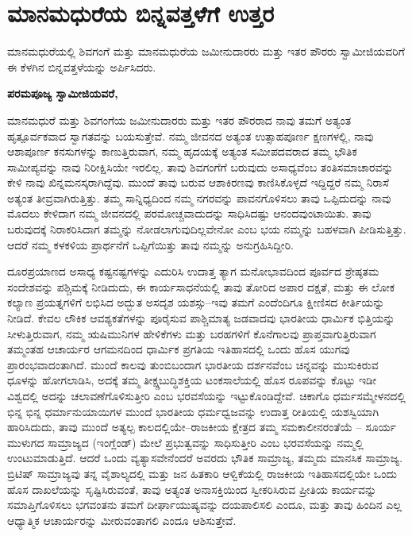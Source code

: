 
\chapter{ಮಾನಮಧುರೆಯ ಬಿನ್ನವತ್ತಳೆಗೆ ಉತ್ತರ}

ಮಾನಮಧುರೆಯಲ್ಲಿ ಶಿವಗಂಗೆ ಮತ್ತು ಮಾನಮಧುರೆಯ ಜಮೀನುದಾರರು ಮತ್ತು ಇತರ ಪೌರರು ಸ್ವಾಮೀಜಿಯವರಿಗೆ ಈ ಕೆಳಗಿನ ಬಿನ್ನವತ್ತಳೆಯನ್ನು ಅರ್ಪಿಸಿ\-ದರು.

\textbf{ಪರಮಪೂಜ್ಯ ಸ್ವಾಮೀಜಿಯವರೆ,}

ಮಾನಮಧುರೆ ಮತ್ತು ಶಿವಗಂಗೆಯ ಜಮೀನುದಾರರು ಮತ್ತು ಇತರ ಪೌರರಾದ ನಾವು ತಮಗೆ ಅತ್ಯಂತ ಹೃತ್ಪೂರ್ವಕವಾದ ಸ್ವಾಗತವನ್ನು ಬಯಸುತ್ತೇವೆ. ನಮ್ಮ ಜೀವನದ ಅತ್ಯಂತ ಉತ್ಸಾಹಪೂರ್ಣ ಕ್ಷಣಗಳಲ್ಲಿ, ನಾವು ಆಶಾಪೂರ್ಣ ಕನಸುಗಳನ್ನು ಕಾಣುತ್ತಿರುವಾಗ, ನಮ್ಮ ಹೃದಯಕ್ಕೆ ಅತ್ಯಂತ ಸಮೀಪದವರಾದ ತಮ್ಮ ಭೌತಿಕ ಸಾಮೀಪ್ಯವನ್ನು ನಾವು ನಿರೀಕ್ಷಿಸಿಯೇ ಇರಲಿಲ್ಲ. ತಾವು ಶಿವಗಂಗೆಗೆ ಬರುವುದು ಅಸಾಧ್ಯವೆಂಬ ತಂತಿಸಮಾಚಾರವನ್ನು ಕೇಳಿ ನಾವು ಖಿನ್ನಮನಸ್ಕರಾಗಿದ್ದೆವು. ಮುಂದೆ ತಾವು ಬರುವ ಆಶಾಕಿರಣವು ಕಾಣಿಸಿಕೊಳ್ಳದೆ ಇದ್ದಿದ್ದರೆ ನಮ್ಮ ನಿರಾಸೆ ಅತ್ಯಂತ ತೀವ್ರವಾಗಿರುತ್ತಿತ್ತು. ತಮ್ಮ ಸಾನ್ನಿಧ್ಯದಿಂದ ನಮ್ಮ ನಗರವನ್ನು ಪಾವನಗೊಳಿಸಲು ತಾವು ಒಪ್ಪಿದುದನ್ನು ನಾವು ಮೊದಲು ಕೇಳಿದಾಗ ನಮ್ಮ ಜೀವನದಲ್ಲಿ ಪರಮೋಚ್ಚವಾದುದನ್ನು ಸಾಧಿಸಿದಷ್ಟು ಆನಂದವುಂಟಾಯಿತು. ತಾವು ಬರುವುದಕ್ಕೆ ನಿರಾಕರಿಸಿದಾಗ ತಮ್ಮನ್ನು ನೋಡಲಾಗುವುದಿಲ್ಲವೇನೋ ಎಂಬ ಭಯ ನಮ್ಮನ್ನು ಬಹಳವಾಗಿ ಪೀಡಿಸುತ್ತಿತ್ತು. ಆದರೆ ನಮ್ಮ ಕಳಕಳಿಯ ಪ್ರಾರ್ಥನೆಗೆ ಒಪ್ಪಿಗೆಯಿತ್ತು ತಾವು ನಮ್ಮನ್ನು ಅನುಗ್ರಹಿಸಿದ್ದೀರಿ.

ದೂರಪ್ರಯಾಣದ ಅಸಾಧ್ಯ ಕಷ್ಟನಷ್ಟಗಳನ್ನು ಎದುರಿಸಿ ಉದಾತ್ತ ತ್ಯಾಗ ಮನೋಭಾವದಿಂದ ಪೂರ್ವದ ಶ್ರೇಷ್ಠತಮ ಸಂದೇಶವನ್ನು ಪಶ್ಚಿಮಕ್ಕೆ ನೀಡಿದುದು, ಈ ಕಾರ್ಯಸಾಧನೆಯಲ್ಲಿ ತಾವು ತೋರಿದ ಅಪಾರ ದಕ್ಷತೆ, ಮತ್ತು ಈ ಲೋಕ ಕಲ್ಯಾಣ ಪ್ರಯತ್ನಗಳಿಗೆ ಲಭಿಸಿದ ಅದ್ಭುತ ಅಸದೃಶ ಯಶಸ್ಸು–ಇವು ತಮಗೆ ಎಂದೆಂದಿಗೂ ಕ್ಷೀಣಿಸದ ಕೀರ್ತಿಯನ್ನು ನೀಡಿದೆ. ಕೇವಲ ಲೌಕಿಕ ಆವಶ್ಯ\-ಕತೆಗಳನ್ನು ಪೂರೈಸುವ ಪಾಶ್ಚಿಮಾತ್ಯ ಜಡವಾದವು ಭಾರತೀಯ ಧಾರ್ಮಿಕ ಭಿತ್ತಿಯನ್ನು ಸೀಳುತ್ತಿರುವಾಗ, ನಮ್ಮ ಋಷಿಮುನಿಗಳ ಹೇಳಿಕೆಗಳು ಮತ್ತು ಬರಹಗಳಿಗೆ ಕೊನೆಗಾಲವು ಪ್ರಾಪ್ತವಾಗುತ್ತಿರುವಾಗ ತಮ್ಮಂತಹ ಆಚಾರ್ಯರ ಆಗಮನದಿಂದ ಧಾರ್ಮಿಕ ಪ್ರಗತಿಯ ಇತಿಹಾಸದಲ್ಲಿ ಒಂದು ಹೊಸ ಯುಗವು ಪ್ರಾರಂಭವಾದಂತಾಗಿದೆ. ಮುಂದೆ ಕಾಲವು ತುಂಬಿಬಂದಾಗ ಭಾರತೀಯ ದರ್ಶನವೆಂಬ ಚಿನ್ನವನ್ನು ಮುಸುಕಿರುವ ಧೂಳನ್ನು ಹೋಗಲಾಡಿಸಿ, ಅದಕ್ಕೆ ತಮ್ಮ ತೀಕ್ಷ್ಣಬುದ್ಧಿಶಕ್ತಿಯ ಟಂಕಸಾಲೆಯಲ್ಲಿ ಹೊಸ ರೂಪವನ್ನು ಕೊಟ್ಟು ಇಡೀ ವಿಶ್ವದಲ್ಲಿ ಅದನ್ನು ಚಲಾವಣೆಗೊಳಿಸುತ್ತೀರಿ ಎಂಬ ಭರವಸೆಯನ್ನು ಇಟ್ಟುಕೊಂಡಿದ್ದೇವೆ. ಚಿಕಾಗೊ ಧರ್ಮಸಮ್ಮೇಳನದಲ್ಲಿ ಭಿನ್ನ ಭಿನ್ನ ಧರ್ಮಾನುಯಾಯಿಗಳ ಮುಂದೆ ಭಾರತೀಯ ಧರ್ಮಧ್ವಜವನ್ನು ಉದಾತ್ತ ರೀತಿಯಲ್ಲಿ ಯಶಸ್ವಿಯಾಗಿ ಹಾರಿಸಿದುದು, ತಾವು ಮುಂದೆ ಅತ್ಯಲ್ಪ ಕಾಲದಲ್ಲಿಯೇ–ರಾಜಕೀಯ ಕ್ಷೇತ್ರದ ತಮ್ಮ ಸಮಕಾಲೀನರಂತೆಯೆ – ಸೂರ್ಯ ಮುಳುಗದ ಸಾಮ್ರಾಜ್ಯದ (ಇಂಗ್ಲೆಂಡ್​) ಮೇಲೆ ಪ್ರಭುತ್ವವನ್ನು ಸಾಧಿಸುತ್ತೀರಿ ಎಂಬ ಭರವಸೆಯನ್ನು ನಮ್ಮಲ್ಲಿ ಉಂಟುಮಾಡುತ್ತಿದೆ. ಆದರೆ ಒಂದು ವ್ಯತ್ಯಾಸವೇನೆಂದರೆ ಅವರದು ಭೌತಿಕ ಸಾಮ್ರಾಜ್ಯ, ತಮ್ಮದು ಮಾನಸಿಕ ಸಾಮ್ರಾಜ್ಯ. ಬ್ರಿಟಿಷ್​ ಸಾಮ್ರಾಜ್ಯವು ತನ್ನ ವೈಶಾಲ್ಯದಲ್ಲಿ ಮತ್ತು ಜನ ಹಿತಕಾರಿ ಆಳ್ವಿಕೆಯಲ್ಲಿ ರಾಜಕೀಯ ಇತಿಹಾಸ\-ದಲ್ಲಿಯೇ ಒಂದು ಹೊಸ ದಾಖಲೆಯನ್ನು ಸೃಷ್ಟಿಸಿರುವಂತೆ, ತಾವು ಅತ್ಯಂತ ಅನಾಸಕ್ತಿಯಿಂದ ಸ್ವೀಕರಿಸಿರುವ ಪ್ರೀತಿಯ ಕಾರ್ಯವನ್ನು ಸಮಾಪ್ತಿಗೊಳಿಸಲು ಭಗವಂತನು ತಮಗೆ ದೀರ್ಘಾಯುಷ್ಯವನ್ನು ದಯಪಾಲಿಸಲಿ ಎಂದೂ, ಮತ್ತು ತಾವು ಹಿಂದಿನ ಎಲ್ಲ ಆಧ್ಯಾತ್ಮಿಕ ಆಚಾರ್ಯರನ್ನು ಮೀರುವಂತಾಗಲಿ ಎಂದೂ ಆಶಿಸುತ್ತೇವೆ.

